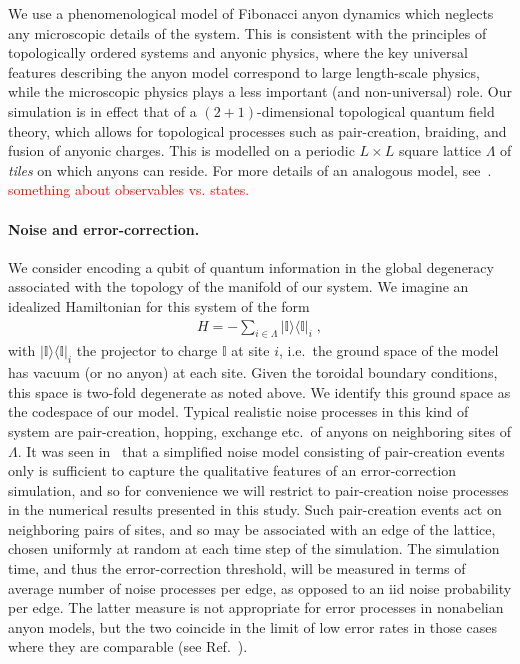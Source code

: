 \documentclass[aps, prl, letterpaper, twocolumn, superscriptaddress, notitlepage, 10pt]{revtex4-1}
\newcommand{\ket}[1]{|{#1}\rangle}
\newcommand{\bra}[1]{\langle{#1}|}
\newcommand{\ketbra}[2]{\ket{#1}\!\bra{#2}}
\newcommand{\proj}[1]{\ketbra{#1}{#1}}
\newcommand{\dude}[1]{\textcolor{red}{#1}}
\begin{document}
We use a phenomenological model of Fibonacci anyon dynamics which neglects any 
microscopic details of the system. 
This is consistent with the principles of topologically 
ordered systems and anyonic physics, where the key universal features describing the 
anyon model correspond to large length-scale physics, while the microscopic physics plays 
a less important (and non-universal) role.
Our simulation is in effect that of a $(2+1)$-dimensional topological quantum field theory, which allows for topological processes such as pair-creation, braiding, and fusion of anyonic charges. This is modelled on a periodic $L\times L$ square lattice $\Lambda$ of \emph{tiles} on which anyons can reside.  For more details of an analogous model, see~\cite{Brell2013}.
\dude{something about observables vs. states.}

\paragraph{Noise and error-correction.}

We consider encoding a qubit of quantum information in the global degeneracy associated 
with the topology of the manifold of our system. We imagine an idealized Hamiltonian for this 
system of the form
\begin{align}
	H=-\sum_{i\in \Lambda}\proj{\mathbb{I}}_i\;,\label{e:hamiltonian}
\end{align}
with $\proj{\mathbb{I}}_i$ the projector to charge $\mathbb{I}$ at site $i$, i.e.~the ground 
space of the model has vacuum (or no anyon) at each site. Given the toroidal boundary 
conditions, this space is two-fold degenerate as noted above. We identify this ground space 
as the codespace of our model. Typical realistic noise processes in this kind of system are 
pair-creation, hopping, exchange etc.~of anyons on neighboring sites of $\Lambda$. It was 
seen in~\cite{Brell2013} that a simplified noise model consisting of pair-creation events only 
is sufficient to capture the qualitative features of an error-correction simulation, and so for convenience we 
will restrict to pair-creation noise processes in the numerical results presented in this study. 
Such pair-creation events act on neighboring pairs of sites,
and so may be associated with an edge of the lattice, chosen 
uniformly at random at each time step of the simulation. The simulation time, and thus the 
error-correction threshold, will be measured in terms of average number of noise processes 
per edge, as opposed to an iid noise probability per edge. The latter measure is not 
appropriate for error processes in nonabelian anyon models, but the two coincide in the limit 
of low error rates in those cases where they are comparable (see Ref.~\cite{Brell2013}).
\end{document}

